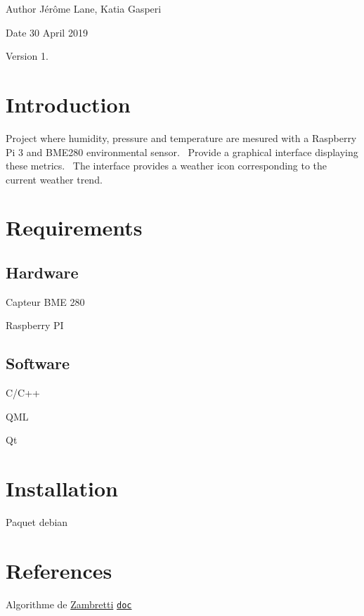 \begin{DoxyAuthor}{Author}
Jérôme Lane, Katia Gasperi 
\end{DoxyAuthor}
\begin{DoxyDate}{Date}
30 April 2019 
\end{DoxyDate}
\begin{DoxyVersion}{Version}
1. 
\end{DoxyVersion}
\hypertarget{index_intro_sec}{}\section{Introduction}\label{index_intro_sec}
Project where humidity, pressure and temperature are mesured with a Raspberry Pi 3 and B\+M\+E280 environmental sensor.~\newline
 Provide a graphical interface displaying these metrics.~\newline
 The interface provides a weather icon corresponding to the current weather trend.\hypertarget{index_requirements_sec}{}\section{Requirements}\label{index_requirements_sec}
\hypertarget{index_Hardware}{}\subsection{Hardware}\label{index_Hardware}

\begin{DoxyItemize}
\item Capteur B\+ME 280 
\item Raspberry PI 
\end{DoxyItemize}\hypertarget{index_Software}{}\subsection{Software}\label{index_Software}

\begin{DoxyItemize}
\item C/\+C++ 
\item Q\+ML 
\item Qt 
\end{DoxyItemize}\hypertarget{index_install_sec}{}\section{Installation}\label{index_install_sec}
Paquet debian \hypertarget{index_References}{}\section{References}\label{index_References}

\begin{DoxyItemize}
\item Algorithme de \hyperlink{class_zambretti}{Zambretti} 
\footnotesize \href{https://web.archive.org/web/20110610213848/http://www.meteormetrics.com/zambretti.htm}{\tt doc}
\normalsize 
\end{DoxyItemize}

~\newline
~\newline
 